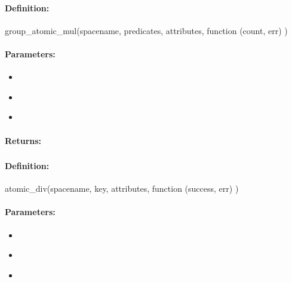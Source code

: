 \paragraph{Definition:}
\begin{javascriptcode}
group_atomic_mul(spacename, predicates, attributes, function (count, err) {})
\end{javascriptcode}
\paragraph{Parameters:}
\begin{itemize}[noitemsep]
\item {}\\

\item {}\\

\item {}\\

\end{itemize}

\paragraph{Returns:}


\pagebreak
\subsubsection{}
\label{api:nodejs:atomic_div}


\paragraph{Definition:}
\begin{javascriptcode}
atomic_div(spacename, key, attributes, function (success, err) {})
\end{javascriptcode}
\paragraph{Parameters:}
\begin{itemize}[noitemsep]
\item {}\\

\item {}\\

\item {}\\

\end{itemize}

